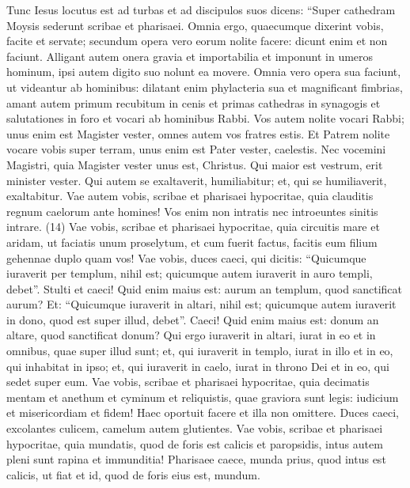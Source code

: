 \begin{biblechapter}  
\verse Tunc Iesus locutus est ad turbas et ad discipulos suos 
\verse dicens: “Super cathedram Moysis sederunt scribae et pharisaei. 
\verse Omnia ergo, quaecumque dixerint vobis, facite et servate; secundum opera vero eorum nolite facere: dicunt enim et non faciunt. 
\verse Alligant autem onera gravia et importabilia et imponunt in umeros hominum, ipsi autem digito suo nolunt ea movere. 
\verse Omnia vero opera sua faciunt, ut videantur ab hominibus: dilatant enim phylacteria sua et magnificant fimbrias, 
\verse amant autem primum recubitum in cenis et primas cathedras in synagogis 
\verse et salutationes in foro et vocari ab hominibus Rabbi. 
\verse Vos autem nolite vocari Rabbi; unus enim est Magister vester, omnes autem vos fratres estis. 
\verse Et Patrem nolite vocare vobis super terram, unus enim est Pater vester, caelestis. 
\verse Nec vocemini Magistri, quia Magister vester unus est, Christus. 
\verse Qui maior est vestrum, erit minister vester. 
\verse Qui autem se exaltaverit, humiliabitur; et, qui se humiliaverit, exaltabitur. 
\verse Vae autem vobis, scribae et pharisaei hypocritae, quia clauditis regnum caelorum ante homines! Vos enim non intratis nec introeuntes sinitis intrare. (14) 
\verse Vae vobis, scribae et pharisaei hypocritae, quia circuitis mare et aridam, ut faciatis unum proselytum, et cum fuerit factus, facitis eum filium gehennae duplo quam vos! 
\verse Vae vobis, duces caeci, qui dicitis: “Quicumque iuraverit per templum, nihil est; quicumque autem iuraverit in auro templi, debet”. 
\verse Stulti et caeci! Quid enim maius est: aurum an templum, quod sanctificat aurum? 
\verse Et: “Quicumque iuraverit in altari, nihil est; quicumque autem iuraverit in dono, quod est super illud, debet”. 
\verse Caeci! Quid enim maius est: donum an altare, quod sanctificat donum? 
\verse Qui ergo iuraverit in altari, iurat in eo et in omnibus, quae super illud sunt; 
\verse et, qui iuraverit in templo, iurat in illo et in eo, qui inhabitat in ipso; 
\verse et, qui iuraverit in caelo, iurat in throno Dei et in eo, qui sedet super eum. 
\verse Vae vobis, scribae et pharisaei hypocritae, quia decimatis mentam et anethum et cyminum et reliquistis, quae graviora sunt legis: iudicium et misericordiam et fidem! Haec oportuit facere et illa non omittere. 
\verse Duces caeci, excolantes culicem, camelum autem glutientes. 
\verse Vae vobis, scribae et pharisaei hypocritae, quia mundatis, quod de foris est calicis et paropsidis, intus autem pleni sunt rapina et immunditia! 
\verse Pharisaee caece, munda prius, quod intus est calicis, ut fiat et id, quod de foris eius est, mundum. 

\end{biblechapter}
